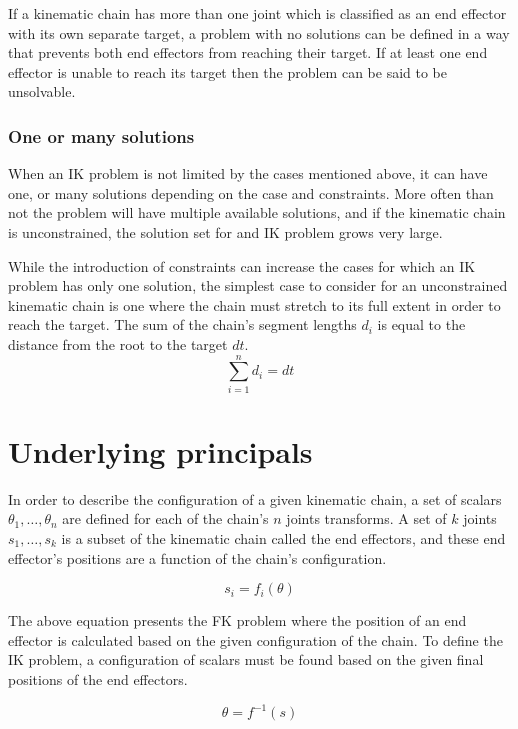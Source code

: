 If a kinematic chain has more than one joint which is classified as an end
effector with its own separate target, a problem with no solutions can be
defined in a way that prevents both end effectors from reaching their target.
If at least one end effector is unable to reach its target then the problem can
be said to be unsolvable.

\subsubsection{One or many solutions}
When an IK problem is not limited by the cases mentioned above, it can have one,
or many solutions depending on the case and constraints. More often than not the
problem will have multiple available solutions, and if the kinematic chain is
unconstrained, the solution set for and IK problem grows very large.

While the introduction of constraints can increase the cases for which an IK
problem has only one solution, the simplest case to consider for an
unconstrained kinematic chain is one where the chain must stretch to its full
extent in order to reach the target. The sum of the chain's segment lengths
\(d_i\) is equal to the distance from the root to the target \(dt\).
\begin{equation}
    \sum_{i=1}^{n}d_i = dt
\end{equation}

\section{Underlying principals}
In order to describe the configuration of a given kinematic chain, a set of
scalars \(\theta_1, \dots, \theta_n\) are defined for each of the chain's \(n\)
joints transforms. A set of \(k\) joints \(s_1, \dots, s_k\) is a subset of
the kinematic chain called the end effectors, and these end effector's positions
are a function of the chain's configuration.

\begin{equation}
    s_i = f_i(\theta)
\end{equation}

The above equation presents the FK problem where the position of an end effector is
calculated based on the given configuration of the chain. To define the IK
problem, a configuration of scalars must be found based on the given final
positions of the end effectors.

\begin{equation}
    \theta = f^{-1}(s)
\end{equation}


